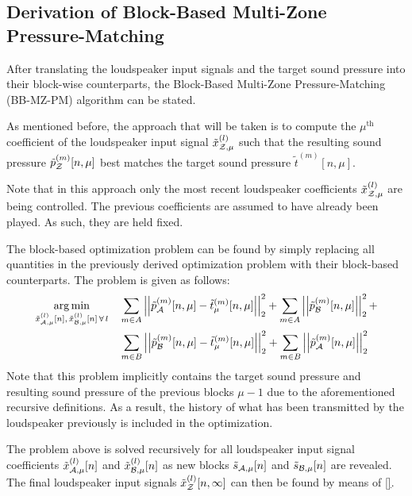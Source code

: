 \subsection{Derivation of Block-Based Multi-Zone Pressure-Matching}
After translating the loudspeaker input signals and the target sound pressure into their block-wise counterparts, 
the Block-Based Multi-Zone Pressure-Matching (BB-MZ-PM) algorithm can be stated.

As mentioned before, the approach that will be taken is to compute the $\mu^\text{th}$ coefficient of the loudspeaker input signal
$\tilde{x}^{(l)}_{\mathcal{Z},\mu}$ such that the resulting sound pressure $\tilde{p}_{\mathcal{Z}}^{(m)}[n, \mu]$ best matches the target sound pressure 
$\tilde{t}^{(m)}[n, \mu]$. 

Note that in this approach only the most recent loudspeaker coefficients $\tilde{x}^{(l)}_{\mathcal{Z},\mu}$ are being controlled. 
The previous coefficients are assumed to have already been played.
As such, they are held fixed.

The block-based optimization problem can be found by simply replacing all quantities in the previously derived optimization problem
with their block-based counterparts.
The problem is given as follows:
\begin{align}
    \argmin{\tilde{x}_{\za,\mu}^{(l)}[n],\,\tilde{x}_{\zb,\mu}^{(l)}[n]\,\forall\,l}{
       &\sum_{m\in A} \norm[2][2]{\tilde{p}_{\za}^{(m)}[n,\mu] - \tilde{t}_\mu^{(m)}[n,\mu]} +
       \sum_{m\in A} \norm[2][2]{\tilde{p}_{\zb}^{(m)}[n,\mu]} + \\
       &\sum_{m\in B} \norm[2][2]{\tilde{p}_{\zb}^{(m)}[n,\mu] - \tilde{t}_\mu^{(m)}[n,\mu]} + 
       \sum_{m\in B} \norm[2][2]{\tilde{p}_{\za}^{(m)}[n,\mu]}
    }
\end{align}
Note that this problem implicitly contains the target sound pressure and resulting sound pressure of the previous blocks $\mu - 1$ due to
the aforementioned recursive definitions.
As a result, the history of what has been transmitted by the loudspeaker previously is included in the optimization.

The problem above is solved recursively for all loudspeaker input signal coefficients $\tilde{x}_{\mathcal{A},\mu}^{(l)}[n]$ and $\tilde{x}_{\mathcal{B},\mu}^{(l)}[n]$
as new blocks $\tilde{s}_{\mathcal{A},\mu}[n]$ and $\tilde{s}_{\mathcal{B},\mu}[n]$ are revealed.
The final loudspeaker input signals $\tilde{x}_{\mathcal{Z}}^{(l)}[n, \infty]$  can then be found by means of \autoref{}.
